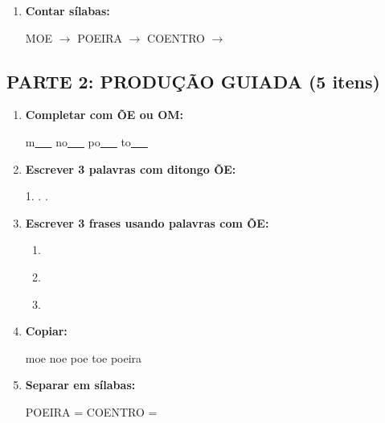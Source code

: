 \begin{exercicio}
\begin{enumerate}
  \item \textbf{Contar sílabas:}
  \begin{center}
  MOE $\rightarrow$ \underline{\hspace{1cm}} \quad POEIRA $\rightarrow$ \underline{\hspace{1cm}} \quad COENTRO $\rightarrow$ \underline{\hspace{1cm}}
  \end{center}
\end{enumerate}

\subsection*{PARTE 2: PRODUÇÃO GUIADA (5 itens)}

\begin{enumerate}[resume]
  \item \textbf{Completar com \~OE ou OM:}
  \begin{center}
  m\underline{~~~} \quad no\underline{~~~} \quad po\underline{~~~} \quad to\underline{~~~}
  \end{center}

  \item \textbf{Escrever 3 palavras com ditongo \~OE:}
  \begin{center}
  1. \underline{\hspace{3cm}} . \underline{\hspace{3cm}} . \underline{\hspace{3cm}}
  \end{center}

  \item \textbf{Escrever 3 frases usando palavras com \~OE:}
  \begin{enumerate}[label=\alph*)]
    \item \underline{\hspace{8cm}}
    \item \underline{\hspace{8cm}}
    \item \underline{\hspace{8cm}}
  \end{enumerate}

  \item \textbf{Copiar:}
  \begin{center}
  moe \quad noe \quad poe \quad toe \quad poeira
  \end{center}

  \item \textbf{Separar em sílabas:}
  \begin{center}
  POEIRA = \underline{\hspace{1cm}} \underline{\hspace{1cm}} \underline{\hspace{1cm}} \quad COENTRO = \underline{\hspace{1cm}} \underline{\hspace{1cm}} \underline{\hspace{1cm}}
  \end{center}
\end{enumerate}


\end{exercicio}
